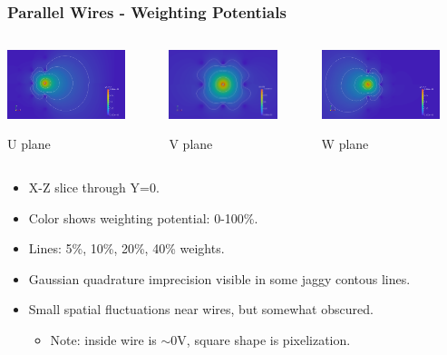 \documentclass[xcolor=dvipsnames]{beamer}
\begin{document}
\begin{frame}
  \frametitle{Parallel Wires - Weighting Potentials}
  \begin{columns}
    \begin{column}{0.3\textwidth}
      \begin{center}
        \includegraphics[height=2cm]{twodee-fine-u7.png}

        \scriptsize U plane
      \end{center}
    \end{column}
    \begin{column}{0.3\textwidth}
      \begin{center}
        \includegraphics[height=2cm]{twodee-fine-v7.png}
        
        \scriptsize V plane
      \end{center}
    \end{column}
    \begin{column}{0.3\textwidth}
      \begin{center}
        \includegraphics[height=2cm]{twodee-fine-w7.png}

        \scriptsize W plane
      \end{center}
    \end{column}
  \end{columns}

  \begin{itemize}\footnotesize
  \item X-Z slice through Y=0.
  \item Color shows weighting potential: 0-100\%.
  \item Lines: 5\%, 10\%, 20\%, 40\% weights.
  \item Gaussian quadrature imprecision visible in some jaggy contous lines.
  \item Small spatial fluctuations near wires, but somewhat obscured.
    \begin{itemize}
    \item Note: inside wire is $\sim$0V, square shape is pixelization.
    \end{itemize}
  \end{itemize}

\end{frame}
\end{document}
